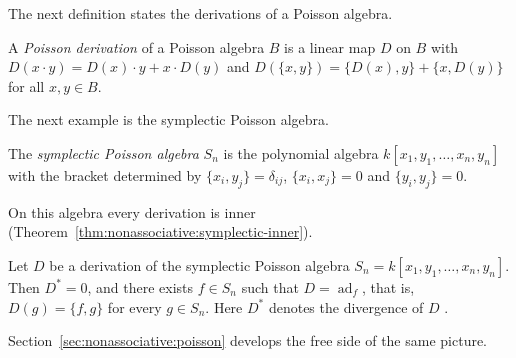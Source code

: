 The next definition states the derivations of a Poisson algebra.

\begin{definition}
\label{def:nonassociative:delta-poisson-derivation}
A \emph{Poisson derivation} of a Poisson algebra $B$ is a linear map
$D$ on $B$ with $D(x\cdot y)=D(x)\cdot y+x\cdot D(y)$ and
$D(\{x,y\})=\{D(x),y\}+\{x,D(y)\}$ for all $x,y\in B$.
\end{definition}

The next example is the symplectic Poisson algebra.

\begin{example}
\label{ex:nonassociative:symplectic-poisson}
The \emph{symplectic Poisson algebra} $S_n$ is the polynomial algebra
$k[x_1,y_1,\dots,x_n,y_n]$ with the bracket determined by
$\{x_i,y_j\}=\delta_{ij}$, $\{x_i,x_j\}=0$ and $\{y_i,y_j\}=0$.
\end{example}

On this algebra every derivation is inner
(Theorem~\ref{thm:nonassociative:symplectic-inner}).

\begin{theorem}
\label{thm:nonassociative:symplectic-inner}
Let $D$ be a derivation of the symplectic Poisson algebra
$S_n=k[x_1,y_1,\dots,x_n,y_n]$. Then $D^{*}=0$, and there exists
$f\in S_n$ such that $D=\operatorname{ad}_f$, that is,
$D(g)=\{f,g\}$ for every $g\in S_n$. Here $D^{*}$ denotes the
divergence of $D$ \cite[p.~657]{AlbertiArestiLi2018Poisson}.
\end{theorem}

Section~\ref{sec:nonassociative:poisson} develops the free side of the
same picture.
